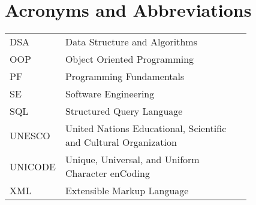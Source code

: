\chapter*{Acronyms and Abbreviations}

\begin{flushleft}
\begin{tabular}{l p{0.8\linewidth}}
DSA&	Data Structure and Algorithms\\
OOP	&Object Oriented Programming\\
PF	&Programming Fundamentals\\
SE	&Software Engineering\\
SQL	&Structured Query Language\\
UNESCO&	United Nations Educational, Scientific and Cultural Organization\\
UNICODE&	Unique, Universal, and Uniform Character enCoding\\
XML	&Extensible Markup Language\\

\end{tabular}
\end{flushleft}

